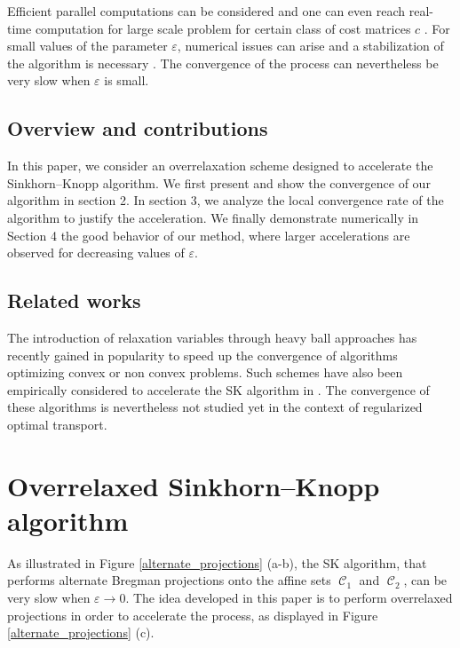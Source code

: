 \documentclass{article} %
\DeclareMathOperator{\Ccal}{\mathcal{C}}
\renewcommand{\epsilon}{\varepsilon}
\theoremstyle{plain}
\theoremstyle{definition}
\theoremstyle{remark}
\begin{document}
Efficient parallel computations can be considered \cite{cuturi13} and one can even reach real-time computation for large scale problem for certain class of cost matrices $c$ \cite{Solomon2015}. 
For small values of the parameter $\epsilon$, numerical issues can arise and a stabilization of the algorithm is necessary \cite{2016arXiv160705816C}.
The convergence of the process can nevertheless be very slow when $\epsilon$ is small.

\subsection{Overview and contributions}
In this paper, we consider an overrelaxation scheme designed to accelerate the Sinkhorn--Knopp algorithm. We first present and show the convergence of our algorithm in section 2. In section 3, we analyze the local convergence rate of the algorithm to justify the acceleration.
We finally demonstrate numerically  in Section 4 the good behavior of our method, where larger accelerations are observed for decreasing values of $\epsilon$.

\subsection{Related works }
The introduction of relaxation variables through heavy ball approaches \cite{POLYAK19641} has recently gained in popularity  to speed up the convergence of algorithms optimizing convex \cite{2014arXiv1412.7457G} or non convex \cite{Zavriev1993,2016arXiv160609070O} problems. Such schemes have also been empirically considered to accelerate the SK algorithm  in \cite{peyre2016quantum,2017arXiv170801955S}. The convergence of these algorithms is nevertheless not studied yet in the context of regularized optimal transport.


\section{Overrelaxed Sinkhorn--Knopp algorithm}

As illustrated in Figure \ref{alternate_projections} (a-b), the SK algorithm, that  performs alternate Bregman projections onto the affine sets $\Ccal_1$ and $\Ccal_2$, can be very slow when $\epsilon\to 0$. The idea developed in this paper is to perform overrelaxed projections in order to accelerate the process, as displayed in Figure \ref{alternate_projections} (c).
\end{document}
